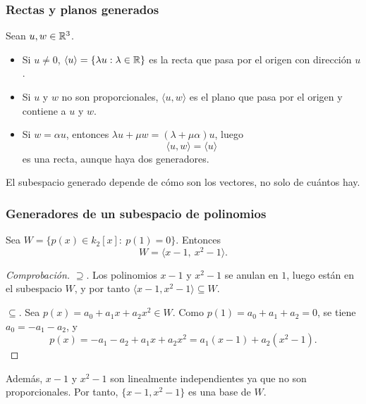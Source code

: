 \begin{frame}
    \frametitle{Rectas y planos generados}

    \begin{example}
        Sean $u,w\in\mathbb{R}^3$.
        \begin{itemize}
            \item Si $u\neq0$, $\langle u\rangle=\{\lambda u:\lambda\in\mathbb{R}\}$
            es la \alert{recta} que pasa por el origen con dirección $u$.
            \item Si $u$ y $w$ no son proporcionales, $\langle u,w\rangle$
            es el \alert{plano} que pasa por el origen y contiene a $u$ y $w$.
            \item Si $w=\alpha u$, entonces
            $\lambda u+\mu w=(\lambda+\mu\alpha)u$, luego
            \[
                \langle u,w\rangle=\langle u\rangle
            \]
            es una recta, aunque haya dos generadores.
        \end{itemize}
    \end{example}

    \medskip

    El subespacio generado depende de cómo son los vectores, no solo de
    cuántos hay.
\end{frame}

\begin{frame}
    \frametitle{Generadores de un subespacio de polinomios}

    \begin{example}
        Sea $W=\{p(x)\in k_2[x]:\ p(1)=0\}$. Entonces
        \[
            W=\langle x-1,\ x^2-1\rangle.
        \]
    \end{example}

    \vspace{-15pt}

    \begin{proof}[Comprobación]
        \alert{$\supseteq$.} Los polinomios $x-1$ y $x^2-1$ se anulan en $1$,
        luego están en el subespacio $W$, y por tanto
        $\langle x-1,x^2-1\rangle\subseteq W$.

        \alert{$\subseteq$.} Sea $p(x)=a_0+a_1x+a_2x^2\in W$. Como
        $p(1)=a_0+a_1+a_2=0$, se tiene $a_0=-a_1-a_2$, y
        \[
            p(x)=-a_1-a_2+a_1x+a_2x^2=a_1(x-1)+a_2(x^2-1).
        \]
    \end{proof}

    Además, $x-1$ y $x^2-1$ son linealmente independientes ya que no son proporcionales. Por tanto, $\{x-1,x^2-1\}$ es una
    \alert{base} de $W$.
\end{frame}

